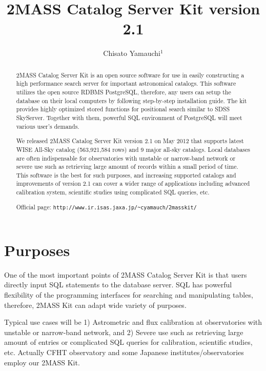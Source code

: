 \documentclass[11pt,twoside]{article}
\begin{document}
\title{2MASS Catalog Server Kit version 2.1}
\author{Chisato Yamauchi$^1$
}

\begin{abstract}
2MASS Catalog Server Kit is an open source software for use 
in easily constructing a high performance search server for 
important astronomical catalogs. 
This software utilizes the open source RDBMS PostgreSQL, therefore, 
any users can setup the database on their local computers by following
step-by-step installation guide. 
The kit provides highly optimized stored functions for positional search
similar to SDSS SkyServer. 
Together with them, powerful SQL environment of PostgreSQL will meet
various user's demands.

We released 2MASS Catalog Server Kit version 2.1 on May 2012 
that supports latest WISE All-Sky catalog (563,921,584 rows) and 9 
major all-sky catalogs.
Local databases are often indispensable for observatories with 
unstable or narrow-band network or severe use such as
retrieving large amount of records
within a small period of time.
This software is the best for such purposes, and
increasing supported catalogs and improvements of version 2.1 
can cover a wider range of applications including
advanced calibration system, scientific studies
using complicated SQL queries, etc.

Official page: {\tt http://www.ir.isas.jaxa.jp/\~{}cyamauch/2masskit/}
\end{abstract}


\section{Purposes}

One of the most important points of 2MASS Catalog Server Kit 
\citep{yam_2011a} is
that users directly input SQL statements to the database server.
SQL has powerful flexibility of the programming interfaces for searching
and manipulating tables, 
therefore, 2MASS Kit can adapt wide variety of purposes.

Typical use cases will be 
1) Astrometric and flux calibration at observatories with 
unstable or narrow-band network, and
2) Severe use such as retrieving large amount of entries or 
complicated SQL queries for calibration, scientific studies, etc.
Actually CFHT observatory and some Japanese institutes/observatories 
employ our 2MASS Kit. 
\end{document}
